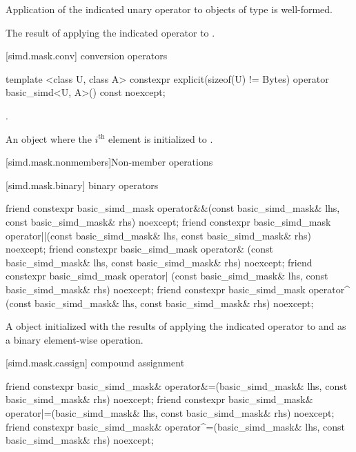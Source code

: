 \begin{itemdescr}
  \pnum\constraints
  Application of the indicated unary operator to objects of type  is well-formed.

  \pnum\returns
  The result of applying the indicated operator to .
\end{itemdescr}

[simd.mask.conv]{ conversion operators}

\begin{itemdecl}
template <class U, class A>
  constexpr explicit(sizeof(U) != Bytes) operator basic_simd<U, A>() const noexcept;
\end{itemdecl}

\begin{itemdescr}
  \pnum\constraints
  .

  \pnum\returns
  An object where the $i^\text{th}$ element is initialized to .
\end{itemdescr}

[simd.mask.nonmembers]{Non-member operations}

[simd.mask.binary]{ binary operators}

\begin{itemdecl}
friend constexpr basic_simd_mask
  operator&&(const basic_simd_mask& lhs, const basic_simd_mask& rhs) noexcept;
friend constexpr basic_simd_mask
  operator||(const basic_simd_mask& lhs, const basic_simd_mask& rhs) noexcept;
friend constexpr basic_simd_mask
  operator& (const basic_simd_mask& lhs, const basic_simd_mask& rhs) noexcept;
friend constexpr basic_simd_mask
  operator| (const basic_simd_mask& lhs, const basic_simd_mask& rhs) noexcept;
friend constexpr basic_simd_mask
  operator^ (const basic_simd_mask& lhs, const basic_simd_mask& rhs) noexcept;
\end{itemdecl}

\begin{itemdescr}
  \pnum\returns
  A  object initialized with the results of applying the indicated operator to  and  as a binary element-wise operation.
\end{itemdescr}

[simd.mask.cassign]{ compound assignment}

\begin{itemdecl}
friend constexpr basic_simd_mask&
  operator&=(basic_simd_mask& lhs, const basic_simd_mask& rhs) noexcept;
friend constexpr basic_simd_mask&
  operator|=(basic_simd_mask& lhs, const basic_simd_mask& rhs) noexcept;
friend constexpr basic_simd_mask&
  operator^=(basic_simd_mask& lhs, const basic_simd_mask& rhs) noexcept;
\end{itemdecl}

